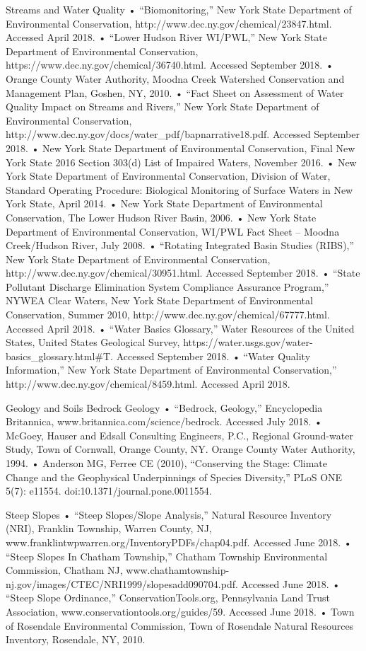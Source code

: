 Streams and Water Quality
    • “Biomonitoring,” New York State Department of Environmental Conservation, http://www.dec.ny.gov/chemical/23847.html.  Accessed April 2018.
    • “Lower Hudson River WI/PWL,” New York State Department of Environmental Conservation, https://www.dec.ny.gov/chemical/36740.html. Accessed September 2018.
    • Orange County Water Authority, Moodna Creek Watershed Conservation and Management Plan, Goshen, NY, 2010.
    • “Fact Sheet on Assessment of Water Quality Impact on Streams and Rivers,” New York State Department of Environmental Conservation, http://www.dec.ny.gov/docs/water_pdf/bapnarrative18.pdf. Accessed September 2018.
    • New York State Department of Environmental Conservation, Final New York State 2016 Section 303(d) List of Impaired Waters, November 2016.
    • New York State Department of Environmental Conservation, Division of Water, Standard Operating Procedure: Biological Monitoring of Surface Waters in New York State, April 2014.
    • New York State Department of Environmental Conservation, The Lower Hudson River Basin, 2006.
    • New York State Department of Environmental Conservation, WI/PWL Fact Sheet – Moodna Creek/Hudson River, July 2008.
    • “Rotating Integrated Basin Studies (RIBS),” New York State Department of Environmental Conservation, http://www.dec.ny.gov/chemical/30951.html. Accessed September 2018.
    • “State Pollutant Discharge Elimination System Compliance Assurance Program,” NYWEA Clear Waters, New York State Department of Environmental Conservation, Summer 2010, http://www.dec.ny.gov/chemical/67777.html. Accessed April 2018.
    • “Water Basics Glossary,” Water Resources of the United States, United States Geological Survey, https://water.usgs.gov/water-basics_glossary.html#T. Accessed September 2018.
    • “Water Quality Information,” New York State Department of Environmental Conservation,” http://www.dec.ny.gov/chemical/8459.html. Accessed April 2018.

Geology and Soils
Bedrock Geology
    • “Bedrock, Geology,” Encyclopedia Britannica, www.britannica.com/science/bedrock. Accessed July 2018.
    • McGoey, Hauser and Edsall Consulting Engineers, P.C., Regional Ground-water Study, Town of Cornwall, Orange County, NY. Orange County Water Authority, 1994.
    • Anderson MG, Ferree CE (2010), “Conserving the Stage: Climate Change and the Geophysical Underpinnings of Species Diversity,” PLoS ONE 5(7): e11554. doi:10.1371/journal.pone.0011554.

Steep Slopes
    • “Steep Slopes/Slope Analysis,” Natural Resource Inventory (NRI), Franklin Township, Warren County, NJ, www.franklintwpwarren.org/InventoryPDFs/chap04.pdf. Accessed June 2018. 
    • “Steep Slopes In Chatham Township,” Chatham Township Environmental Commission, Chatham NJ, www.chathamtownship-nj.gov/images/CTEC/NRI1999/slopesadd090704.pdf. Accessed June 2018.
    • “Steep Slope Ordinance,” ConservationTools.org, Pennsylvania Land Trust Association, www.conservationtools.org/guides/59. Accessed June 2018.
    • Town of Rosendale Environmental Commission, Town of Rosendale Natural Resources Inventory, Rosendale, NY, 2010.

